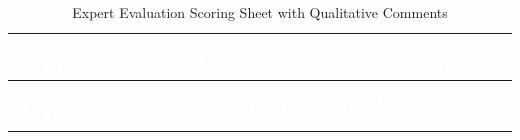 \begin{landscape}
 
\begin{longtable}{>{\bfseries}p{0.4cm} p{3.4cm} >{\centering\arraybackslash}p{0.6cm} >{\centering\arraybackslash}p{0.6cm} >{\centering\arraybackslash}p{0.6cm} >{\centering\arraybackslash}p{0.6cm} >{\centering\arraybackslash}p{0.6cm} >{\centering\arraybackslash}p{0.6cm} p{6.8cm}}
\caption{Expert Evaluation Scoring Sheet with Qualitative Comments}
\label{tab:app_expert_scores} \\
 
\rowcolor{headerblue}
\textcolor{white}{\textbf{\#}} &
\textcolor{white}{\textbf{Scenario Title}} &
\textcolor{white}{\textbf{GM}} &
\textcolor{white}{\textbf{YA}} &
\textcolor{white}{\textbf{CA}} &
\textcolor{white}{\textbf{LV}} &
\textcolor{white}{\textbf{CP}} &
\textcolor{white}{\textbf{CS}} &
\textcolor{white}{\textbf{Expert Comments}} \\
\endfirsthead
 
\multicolumn{9}{c}{\tablename\ \thetable{} -- continued} \\
\rowcolor{headerblue}
\textcolor{white}{\textbf{\#}} &
\textcolor{white}{\textbf{Scenario Title}} &
\textcolor{white}{\textbf{GM}} &
\textcolor{white}{\textbf{YA}} &
\textcolor{white}{\textbf{CA}} &
\textcolor{white}{\textbf{LV}} &
\textcolor{white}{\textbf{CP}} &
\textcolor{white}{\textbf{CS}} &
\textcolor{white}{\textbf{Expert Comments}} \\
\endhead
 

\end{longtable}
\end{landscape}
